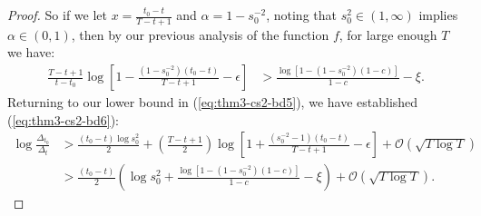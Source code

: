 \documentclass{article}
\begin{document}
\begin{proof}
So if we let $x = \frac{t_0 - t}{T - t + 1}$ and $\alpha = 1 - s_0^{-2}$, noting that $s_0^{2} \in (1,\infty)$ implies $\alpha \in (0,1)$, then by our previous analysis of the function $f$, for large enough $T$ we have:
\begin{align*}
    \frac{T-t+1}{t-t_0}\log\left[1 - \frac{\left(1- s_0^{-2}\right)(t_0 - t)}{T - t + 1} - \epsilon\right] &> \frac{\log[1 -  (1 -s_0^{-2})(1-c)]}{1-c} - \xi.
\end{align*}
Returning to our lower bound in (\ref{eq:thm3-cs2-bd5}), we have established (\ref{eq:thm3-cs2-bd6}):
\begin{align*}
    \log \frac{\Delta_{t_0}}{\Delta_t} &> \frac{(t_0 - t)\log s_0^2}{2} + \left(\frac{T - t + 1}{2}\right)\log\left[1 + \frac{\left(s_0^{-2} -1\right)(t_0 - t)}{T - t + 1} - \epsilon\right] + \mathcal{O}(\sqrt{T \log T}) \\
    &> \frac{(t_0 - t)}{2} \left(\log s_0^2 + \frac{\log[1 -  (1 - s_0^{-2})(1-c)]}{1-c} - \xi\right)  + \mathcal{O}(\sqrt{T \log T}).
\end{align*}


\end{proof}
\end{document}
